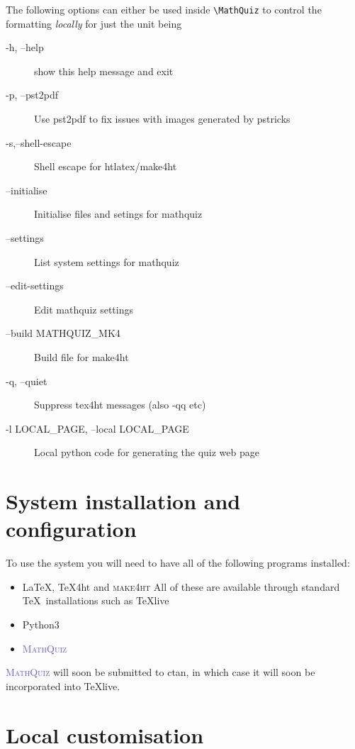 \documentclass[svgnames]{article}
\def\MathQuiz{\textcolor{SlateBlue}{\textsc{MathQuiz}}\xspace}
\begin{document}
    The following options can either be used inside \Verb|\MathQuiz| to
    control the formatting \textit{locally} for just the unit being


    \begin{description}
       \item[ -h, --help]            show this help message and exit
       \item[-p, --pst2pdf]
          Use pst2pdf to fix issues with images generated by pstricks
       \item[-s,--shell-escape]
          Shell escape for htlatex/make4ht
       \item[--initialise]
          Initialise files and setings for mathquiz
       \item[--settings]
          List system settings for mathquiz
       \item[--edit-settings]
          Edit mathquiz settings
       \item[--build MATHQUIZ\_MK4]
          Build file for make4ht
       \item[-q, --quiet]
          Suppress tex4ht messages (also -qq etc)
       \item[-l LOCAL\_PAGE, --local LOCAL\_PAGE]
          Local python code for generating the quiz web page
    \end{description}

\section{System installation and configuration}\label{S:installation}

    To use the system you will need to have all of the following programs installed:
    \begin{itemize}
         \item \LaTeX, \TeX 4ht and \textsc{make4ht}
         All of these are available through standard \TeX\ installations
         such as \TeX live
         \item Python3
         \item \MathQuiz
    \end{itemize}

    \MathQuiz will soon be submitted to ctan, in which case it will soon
    be incorporated into \TeX live.

\section{Local customisation}
\end{document}
